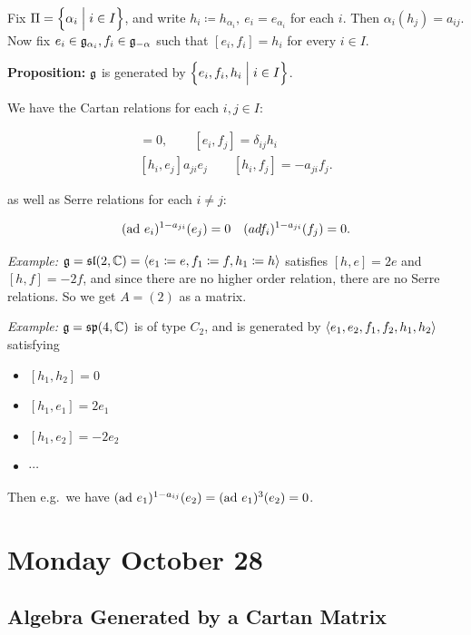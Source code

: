 Fix \(\Pi = \left\{{\alpha_i \mathrel{\Big|} i\in I}\right\}\), and write
\(h_i \coloneqq h_{\alpha_i},~ e_i = e_{\alpha_i}\) for each \(i\). Then
\(\alpha_i(h_j) = a_{ij}\). Now fix
\(e_i \in {\mathfrak{g}}_{\alpha_i}, f_i \in {\mathfrak{g}}_{-\alpha}\) such that
\([e_i, f_i] = h_i\) for every \(i\in I\).

\textbf{Proposition:} \({\mathfrak{g}}\) is generated by
\(\left\{{e_i, f_i, h_i \mathrel{\Big|} i\in I}\right\}\).

We have the Cartan relations for each \(i, j\in I\):

\begin{align*}
[h_i, h_j] = 0, \quad\quad [e_i, f_j] = \delta_{ij} h_i \\
[h_i, e_j] a_{ji} e_j \quad \quad [h_i, f_j] = -a_{ji} f_j
.\end{align*}

as well as Serre relations for each \(i\neq j\):

\begin{align*}
(\mathrm{ad}~ e_i)^{1-a_{ji}}(e_j) = 0 \quad (ad f_i)^{1-a_{ji}}(f_j) = 0
.\end{align*}

\emph{Example:}
\({\mathfrak{g}} = {\mathfrak{sl}}(2, {\mathbb{C}}) = \left\langle{e_1 \coloneqq e, f_1 \coloneqq f, h_1 \coloneqq h}\right\rangle\)
satisfies \([h, e] = 2e\) and \([h, f] = -2f\), and since there are no
higher order relation, there are no Serre relations. So we get
\(A = (2)\) as a matrix.

\emph{Example:} \({\mathfrak{g}} = {\mathfrak{sp}}(4, {\mathbb{C}})\) is of type \(C_2\), and is
generated by \(\left\langle{e_1, e_2, f_1, f_2, h_1, h_2}\right\rangle\) satisfying

\begin{itemize}
\tightlist
\item
  \([h_1, h_2] = 0\)
\item
  \([h_1, e_1] = 2e_1\)
\item
  \([h_1, e_2] = -2 e_2\)
\item
  \(\cdots\)
\end{itemize}

Then e.g.~we have \((\mathrm{ad}~ e_1)^{1-a_{ij}}(e_2) = (\mathrm{ad}~ e_1)^3(e_2) = 0\).

\hypertarget{monday-october-28}{%
\section{Monday October 28}\label{monday-october-28}}

\hypertarget{algebra-generated-by-a-cartan-matrix}{%
\subsection{Algebra Generated by a Cartan
Matrix}\label{algebra-generated-by-a-cartan-matrix}}

